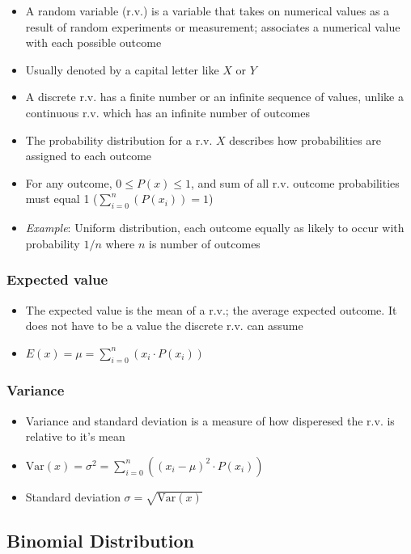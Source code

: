 \documentclass{article}
\begin{document}
\begin{itemize}
    \item A random variable (r.v.) is a variable that takes on numerical values as a result of random experiments or measurement; associates a numerical value with each possible outcome
    \item Usually denoted by a capital letter like $X$ or $Y$
    \item A discrete r.v. has a finite number or an infinite sequence of values, unlike a continuous r.v.  which has an infinite number of outcomes
    \item The probability distribution for a r.v. $X$ describes how probabilities are assigned to each outcome
    \item For any outcome, $0 \leq P(x) \leq 1$, and sum of all r.v. outcome probabilities must equal 1 ($\sum_{i=0}^{n}(P(x_i))=1$)
    \item \textit{Example}: Uniform distribution, each outcome equally as likely to occur with probability $1/n$ where $n$ is number of outcomes
\end{itemize}

\subsubsection{Expected value}

\begin{itemize}
    \item The expected value is the mean of a r.v.; the average expected outcome. It does not have to be a value the discrete r.v. can assume
    \item $E(x)=\mu=\sum_{i=0}^{n}(x_i \cdot P(x_i))$
\end{itemize}

\subsubsection{Variance}

\begin{itemize}
    \item Variance and standard deviation is a measure of how disperesed the r.v. is relative to it's mean
    \item $\text{Var}(x)=\sigma^2=\sum_{i=0}^{n}((x_i - \mu)^2 \cdot P(x_i))$
    \item Standard deviation $\sigma=\sqrt{\text{Var}(x)}$
\end{itemize}

\subsection{Binomial Distribution}
\end{document}
